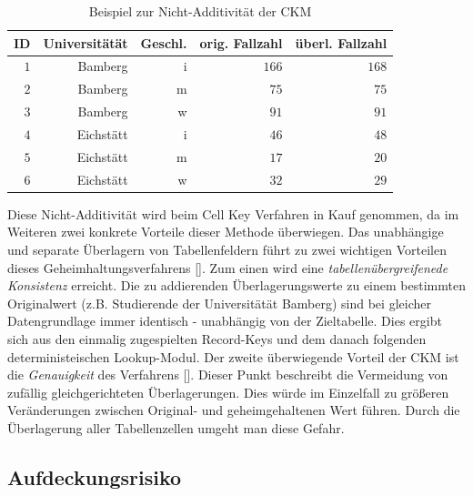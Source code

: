 \begin{table}[h]
    \centering
    \begin{tabular}{ r r r r r}
        \textbf{ID} \vline & \textbf{Universitätät} & \textbf{Geschl.} & \textbf{orig. Fallzahl} & \textbf{überl. Fallzahl} \\ 
        \hline
        $1$ \vline & Bamberg & i & $166$ & $168$ \\
        $2$ \vline & Bamberg & m & $75$ & $75$ \\
        $3$ \vline & Bamberg & w & $91$ & $91$ \\
        $4$ \vline & Eichstätt & i & $46$ & $48$ \\
        $5$ \vline & Eichstätt & m & $17$ & $20$ \\
        $6$ \vline & Eichstätt & w & $32$ & $29$
    \end{tabular}
    \caption{Beispiel zur Nicht-Additivität der CKM}
    \label{tab_additivity}
\end{table}

Diese Nicht-Additivität wird beim Cell Key Verfahren in Kauf genommen, da im Weiteren zwei konkrete Vorteile dieser Methode überwiegen. Das unabhängige und separate Überlagern von Tabellenfeldern führt zu zwei wichtigen Vorteilen dieses Geheimhaltungsverfahrens [\cite{Enderle}]. Zum einen wird eine \textit{tabellenübergreifenede Konsistenz} erreicht. Die zu addierenden Überlagerungswerte zu einem bestimmten Originalwert (z.B. Studierende der Universitätät Bamberg) sind bei gleicher Datengrundlage immer identisch - unabhängig von der Zieltabelle. Dies ergibt sich aus den einmalig zugespielten Record-Keys und dem danach folgenden deterministeischen Lookup-Modul. Der zweite überwiegende Vorteil der CKM ist die \textit{Genauigkeit} des Verfahrens [\cite{Enderle}]. Dieser Punkt beschreibt die Vermeidung von zufällig gleichgerichteten Überlagerungen. Dies würde im Einzelfall zu grö\ss eren Veränderungen zwischen Original- und geheimgehaltenen Wert führen. Durch die Überlagerung aller Tabellenzellen umgeht man diese Gefahr.

\subsection{Aufdeckungsrisiko}




